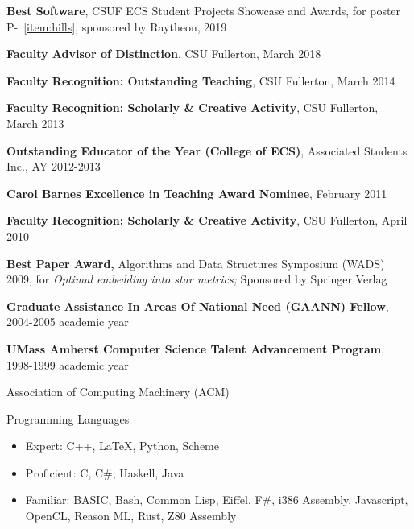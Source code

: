 \documentclass[11pt]{letter}
\begin{document}

\textbf{Best Software}, CSUF ECS Student Projects Showcase and Awards, for
  poster P-~\ref{item:hills}, sponsored by Raytheon, 2019

\textbf{Faculty Advisor of Distinction}, CSU Fullerton, March 2018

\textbf{Faculty Recognition: Outstanding Teaching}, CSU Fullerton, March 2014

\textbf{Faculty Recognition: Scholarly \& Creative Activity}, CSU Fullerton, March 2013

\textbf{Outstanding Educator of the Year (College of ECS)}, Associated Students Inc., AY 2012-2013

\textbf{Carol Barnes Excellence in Teaching Award Nominee}, February 2011

\textbf{Faculty Recognition: Scholarly \& Creative Activity}, CSU Fullerton, April 2010

\textbf{Best Paper Award,} Algorithms and Data Structures Symposium (WADS) 2009, for \emph{Optimal embedding into star metrics;} Sponsored by Springer Verlag

\textbf{Graduate Assistance In Areas Of National Need (GAANN) Fellow}, 2004-2005 academic year

\textbf{UMass Amherst Computer Science Talent Advancement Program}, 1998-1999 academic year


Association of Computing Machinery (ACM) \\


Programming Languages
\begin{itemize}
\item Expert: C++, LaTeX, Python, Scheme
\item Proficient: C, C\#, Haskell, Java
\item Familiar: BASIC, Bash, Common Lisp, Eiffel, F\#, i386 Assembly, Javascript,
  OpenCL, Reason ML, Rust, Z80 Assembly
\end{itemize}
\end{document}
